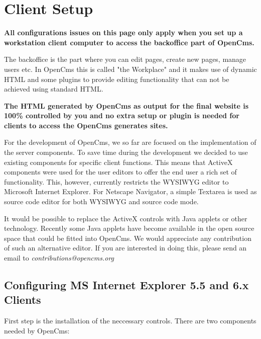 \chapter{Client Setup}
\label{Client Setup}

\textbf{All configurations issues on this page only apply when you
set up a workstation client computer to access the backoffice part of OpenCms.}

The backoffice is the part where you can edit pages, create new pages,
manage users etc. In OpenCms this is called "the Workplace" and it
makes use of dynamic HTML and some plugins to provide editing
functionality that can not be achieved using standard HTML.

\textbf{The HTML generated by OpenCms as output for the final
website is 100\% controlled by you and no extra setup or
plugin is needed for clients to access the OpenCms generates sites.}

For the development of OpenCms, we so far are focused on the
implementation of the server components. To save time during the
development we decided to use existing components for specific
client functions. This means that ActiveX components were used for
the user editors to offer the end user a rich set of
functionality. This, however, currently restricts the WYSIWYG
editor to Microsoft Internet Explorer. For Netscape Navigator, a
simple Textarea is used as source code editor for both WYSIWYG and
source code mode.

It would be possible to replace the ActiveX controls with Java
applets or other technology. Recently some Java applets have become available
in the open source space that could be fitted into OpenCms. 
We would appreciate any contribution of such an alternative editor.
If you are interested in doing this, please send an email 
to {\em contributions@opencms.org}


\section{Configuring MS Internet Explorer 5.5 and 6.x Clients}
\label{browsersettings}

First step is the installation of the neccessary controls. There are
two components needed by OpenCms:

